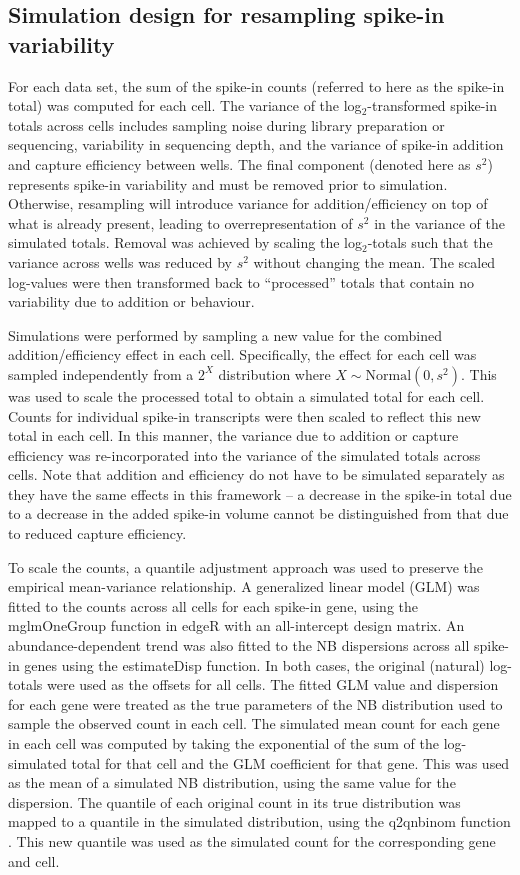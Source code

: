 \documentclass{article}
\begin{document}
\subsection{Simulation design for resampling spike-in variability}
For each data set, the sum of the spike-in counts (referred to here as the spike-in total) was computed for each cell.
The variance of the log$_2$-transformed spike-in totals across cells includes sampling noise during library preparation or sequencing, variability in sequencing depth, and the variance of spike-in addition and capture efficiency between wells.
The final component (denoted here as $s^2$) represents spike-in variability and must be removed prior to simulation.
Otherwise, resampling will introduce variance for addition/efficiency on top of what is already present, leading to overrepresentation of $s^2$ in the variance of the simulated totals.
Removal was achieved by scaling the log$_2$-totals such that the variance across wells was reduced by $s^2$ without changing the mean.
The scaled log-values were then transformed back to ``processed'' totals that contain no variability due to addition or behaviour.

Simulations were performed by sampling a new value for the combined addition/efficiency effect in each cell.
Specifically, the effect for each cell was sampled independently from a $2^X$ distribution where $X \sim \mbox{Normal}(0, s^2)$.
This was used to scale the processed total to obtain a simulated total for each cell.
Counts for individual spike-in transcripts were then scaled to reflect this new total in each cell.
In this manner, the variance due to addition or capture efficiency was re-incorporated into the variance of the simulated totals across cells.
Note that addition and efficiency do not have to be simulated separately as they have the same effects in this framework -- a decrease in the spike-in total due to a decrease in the added spike-in volume cannot be distinguished from that due to reduced capture efficiency.

To scale the counts, a quantile adjustment approach was used to preserve the empirical mean-variance relationship.
A generalized linear model (GLM) was fitted to the counts across all cells for each spike-in gene, using the mglmOneGroup function in edgeR \cite{mccarthy2012differential, robinson2010edgeR} with an all-intercept design matrix.
An abundance-dependent trend was also fitted to the NB dispersions across all spike-in genes using the estimateDisp function.
In both cases, the original (natural) log-totals were used as the offsets for all cells.
The fitted GLM value and dispersion for each gene were treated as the true parameters of the NB distribution used to sample the observed count in each cell.
The simulated mean count for each gene in each cell was computed by taking the exponential of the sum of the log-simulated total for that cell and the GLM coefficient for that gene.
This was used as the mean of a simulated NB distribution, using the same value for the dispersion.
The quantile of each original count in its true distribution was mapped to a quantile in the simulated distribution, using the q2qnbinom function \cite{robinson2008small}.
This new quantile was used as the simulated count for the corresponding gene and cell.
\end{document}
